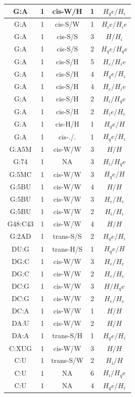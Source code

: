 \begin{center}
\begin{longtable}{c|c|c|c|c}
G:A & 1 & cis-W/H & 1 & $H_qe/H_i$ \\  \hline
G:A & 1 & cis-S/W & 1 & $H_ie/H_ie$ \\  \hline
G:A & 1 & cis-S/S & 3 & $H/H_i$ \\  \hline
G:A & 1 & cis-S/S & 2 & $H_qe/H_qe$ \\  \hline
G:A & 1 & cis-S/H & 5 & $H_e/H_ie$ \\  \hline
G:A & 1 & cis-S/H & 4 & $H_qe/H_i$ \\  \hline
G:A & 1 & cis-S/H & 4 & $H_e/H_ie$ \\  \hline
G:A & 1 & cis-S/H & 2 & $H_i/H_qe$ \\  \hline
G:A & 1 & cis-S/H & 2 & $H_ie/H_e$ \\  \hline
G:A & 1 & cis-H/H & 1 & $H_qe/H$ \\  \hline
G:A & 1 & cis-./. & 1 & $H_qe/H_i$ \\  \hline
G:A5M & 1 & cis-W/W & 3 & $H/H$ \\  \hline
G:74 & 1 & NA & 3 & $H_i/H_qe$ \\  \hline
G:5MC & 1 & cis-W/W & 3 & $H_qe/H$ \\  \hline
G:5BU & 1 & cis-W/W & 4 & $H/H$ \\  \hline
G:5BU & 1 & cis-W/W & 3 & $H_e/H_e$ \\  \hline
G:5BU & 1 & cis-W/W & 2 & $H_i/H_i$ \\  \hline
G48:C43 & 1 & cis-W/W & 4 & $H/H$ \\  \hline
G:2AD & 1 & trans-S/S & 2 & $H_qe/H_i$ \\  \hline
DU:G & 1 & trans-H/S & 1 & $H_qe/H$ \\  \hline
DG:C & 1 & cis-W/W & 3 & $H_e/H_e$ \\  \hline
DG:C & 1 & cis-W/W & 2 & $H_e/H_e$ \\  \hline
DC:G & 1 & cis-W/W & 3 & $H/H_qe$ \\  \hline
DC:G & 1 & cis-W/W & 2 & $H_e/H_e$ \\  \hline
DC:A & 1 & cis-W/W & 1 & $H/H$ \\  \hline
DA:U & 1 & cis-W/W & 2 & $H/H$ \\  \hline
DA:A & 1 & trans-S/H & 1 & $H_qe/H_i$ \\  \hline
C:XUG & 1 & cis-W/W & 3 & $H/H$ \\  \hline
C:U & 1 & trans-S/W & 2 & $H_i/H$ \\  \hline
C:U & 1 & NA & 6 & $H_i/H_qe$ \\  \hline
C:U & 1 & NA & 4 & $H_qe/H_i$ \\  \hline

\end{longtable}
\end{center}
